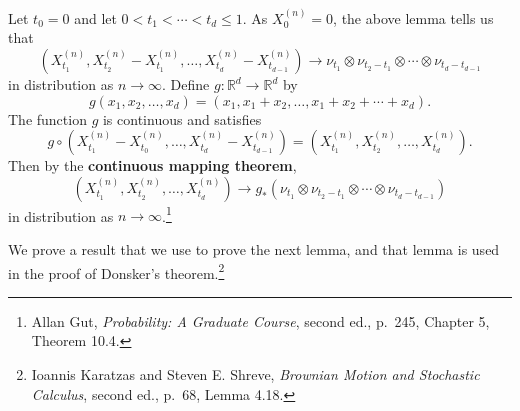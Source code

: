 \documentclass{article}
\theoremstyle{definition}
\begin{document}
Let $t_0=0$ and let $0<t_1<\cdots<t_d \leq 1$. As $X^{(n)}_0=0$,
the above lemma tells us that
\[
(X^{(n)}_{t_1},X^{(n)}_{t_2}-X^{(n)}_{t_1},\ldots,X^{(n)}_{t_d}-X^{(n)}_{t_{d-1}}) \to \nu_{t_1} \otimes \nu_{t_2-t_1} \otimes \cdots \otimes \nu_{t_d-t_{d-1}}
\]
in distribution as $n \to \infty$. 
Define $g:\mathbb{R}^d \to \mathbb{R}^d$ by
\[
g(x_1,x_2,\ldots,x_d) = (x_1,x_1+x_2,\ldots,x_1+x_2+\cdots+x_d).
\]
The function $g$  is continuous and satisfies
\[
g \circ (X^{(n)}_{t_1} - X^{(n)}_{t_{0}},
\ldots,X^{(n)}_{t_d} - X^{(n)}_{t_{d-1}})
=(X^{(n)}_{t_1},X^{(n)}_{t_2},\ldots,X^{(n)}_{t_d}).
\]
Then by the \textbf{continuous mapping theorem},
\begin{equation}
(X^{(n)}_{t_1},X^{(n)}_{t_2},\ldots,X^{(n)}_{t_d}) \to g_* (\nu_{t_1} \otimes \nu_{t_2-t_1} \otimes \cdots \otimes \nu_{t_d-t_{d-1}})
\label{continuousmapping}
\end{equation}
in distribution as $n \to \infty$.\footnote{Allan Gut, {\em Probability: A Graduate Course}, second ed., p.~245, Chapter 5, Theorem 10.4.}




We prove a result that we use to prove the next lemma, and that lemma is used in the proof of Donsker's theorem.\footnote{Ioannis Karatzas and Steven E. Shreve,
{\em Brownian Motion and Stochastic Calculus}, second ed., p.~68, Lemma 4.18.}
\end{document}

